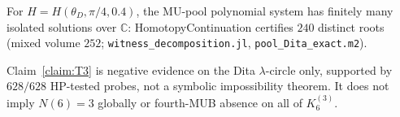 \begin{lemma}
\label{lem:L7}
For $H=H(\theta_D,\pi/4,0.4)$, the MU-pool polynomial system has finitely many isolated
solutions over $\mathbb{C}$: HomotopyContinuation certifies $240$ distinct roots
(mixed volume $252$; \texttt{witness\_decomposition.jl}, \texttt{pool\_Dita\_exact.m2}).
\end{lemma}

\begin{remark}[Scope]
Claim~\ref{claim:T3} is negative evidence on the Dita $\lambda$-circle only,
supported by $628/628$ HP-tested probes, not a symbolic impossibility theorem.
It does not imply $N(6)=3$ globally or fourth-MUB absence on all of $K_6^{(3)}$.
\end{remark}
